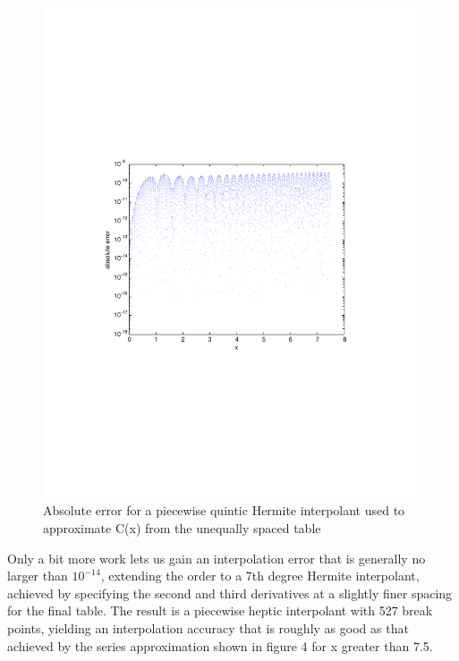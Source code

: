 \documentclass[a4paper,11pt]{article}
\begin{document}
\begin{figure}
\centering
    \includegraphics[width=5in]{quinticHermite.pdf}
        \caption{Absolute error for a piecewise quintic Hermite interpolant used to approximate C(x) from the unequally spaced table}
\end{figure}

Only a bit more work lets us gain an interpolation error that is generally no larger than $10^{-14}$, extending the order to a 7th degree Hermite interpolant, achieved by specifying the second and third derivatives at a slightly finer spacing for the final table. The result is a piecewise heptic interpolant with 527 break points, yielding an interpolation accuracy that is roughly as good as that achieved by the series approximation shown in figure 4 for x greater than 7.5.
\end{document}
